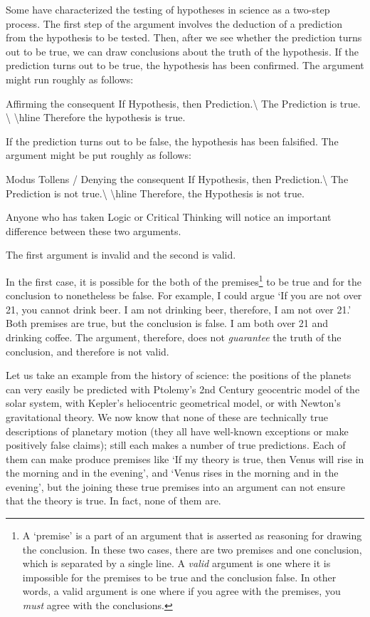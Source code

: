 \begin{refsection}
Some have characterized the testing of hypotheses in science as a two-step process. The first step of the argument involves the deduction of a prediction from the hypothesis to be tested. Then, after we see whether the prediction turns out to be true, we can draw conclusions about the truth of the hypothesis. If the prediction turns out to be true, the hypothesis has been confirmed. The argument might run roughly as follows:
\begin{apatextbox}{Affirming the consequent}
If Hypothesis, then Prediction.\textbackslash{} The Prediction is true. \textbackslash{} \textbackslash{}hline Therefore the hypothesis is true.\end{apatextbox}
If the prediction turns out to be false, the hypothesis has been falsified. The argument might be put roughly as follows:
\begin{apatextbox}{Modus Tollens / Denying the consequent} 
If Hypothesis, then Prediction.\textbackslash{} The Prediction is not true.\textbackslash{} \textbackslash{}hline Therefore, the Hypothesis is not true.\end{apatextbox}
Anyone who has taken Logic or Critical Thinking will notice an important difference between these two arguments. 

The first argument is invalid and the second is valid. 

In the first case, it is possible for the both of the premises\footnote{A `premise' is a part of an argument that is asserted as reasoning for drawing the conclusion. In these two cases, there are two premises and one conclusion, which is separated by a single line. A \emph{valid} argument is one where it is impossible for the premises to be true and the conclusion false. In other words, a valid argument is one where if you agree with the premises, you \emph{must} agree with the conclusions.} to be true and for the conclusion to nonetheless be false. For example, I could argue `If you are not over 21, you cannot drink beer. I am not drinking beer, therefore, I am not over 21.' Both premises are true, but the conclusion is false. I am both over 21 and drinking coffee. The argument, therefore, does not \emph{guarantee} the truth of the conclusion, and therefore is not valid.

Let us take an example from the history of science: the positions of the planets can very easily be predicted with Ptolemy's 2nd Century geocentric model of the solar system, with Kepler's heliocentric geometrical model, or with Newton's gravitational theory. We now know that none of these are technically true descriptions of planetary motion (they all have well-known exceptions or make positively false claims); still each makes a number of true predictions. Each of them can make produce premises like `If my theory is true, then Venus will rise in the morning and in the evening', and `Venus rises in the morning and in the evening', but the joining these true premises into an argument can not ensure that the theory is true. In fact, none of them are.


\end{refsection}
